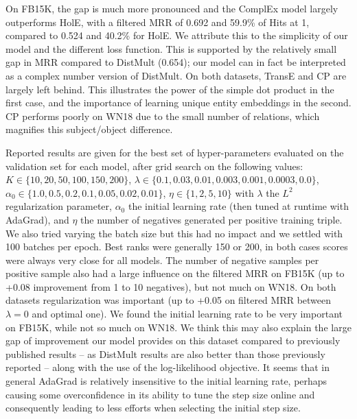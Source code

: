 \documentclass{article}
\newcommand{\rank}{K} %
\begin{document}
On FB15K, the gap is much more pronounced and the ComplEx model largely outperforms HolE, with a filtered MRR of 0.692 and 59.9\% of Hits at 1, compared to 0.524 and 40.2\% for HolE. We attribute this to the simplicity of our model and the different loss function. This is supported by the relatively small gap in MRR compared to DistMult (0.654); our model can in fact be interpreted as a complex number version of DistMult. 
On both datasets, TransE and CP are largely left behind. This illustrates the power of the simple dot product in the first case, and the importance of learning unique entity embeddings in the second. CP performs poorly on WN18 due to the small number of \mbox{relations}, which magnifies this subject/object difference.



Reported results are given for the best set of hyper-parameters evaluated on the validation set for each model, after grid search on the following values: $\rank \in \{10,20,50,100,150,200\}$, $\lambda \in \{0.1, 0.03, 0.01, 0.003, 0.001, 0.0003,0.0\}$, $\alpha_0 \in \{1.0, 0.5, 0.2, 0.1, 0.05, 0.02, 0.01\}$,  $\eta \in \{1, 2, 5, 10\}$ with $\lambda$ the $L^2$ regularization parameter, $\alpha_0$ the initial learning rate (then tuned at runtime with AdaGrad), and $\eta$ the number of negatives generated per positive training triple. We also tried varying the batch size but this had no impact and we settled with 100 batches per epoch. Best ranks were generally 150 or 200, in both cases scores were always very close for all models. The number of negative samples per positive sample also had a large influence on the filtered MRR on FB15K (up to +0.08 improvement from 1 to 10 negatives), but not much on WN18. On both datasets regularization was important (up to +0.05 on filtered MRR between $\lambda=0$ and optimal one).
We found the initial learning rate to be very important on FB15K, while not so much on WN18. We think this may also explain the large gap of improvement our model provides on this dataset compared to previously published results -- as DistMult results are also better than those previously reported \cite{Yang2015} -- along with the use of the log-likelihood objective. It seems that in general AdaGrad is relatively insensitive to the initial learning rate, perhaps causing some overconfidence in its ability to tune the step size online and consequently leading to less efforts when selecting the initial step size.
\end{document}
